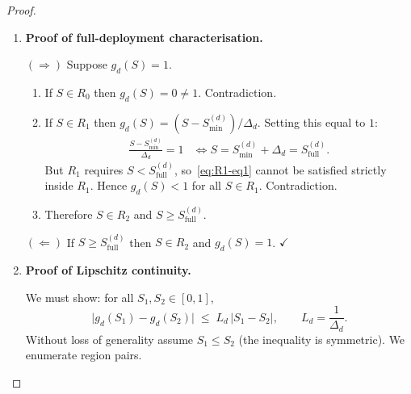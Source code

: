 \documentclass[12pt,openany]{book}
\numberwithin{equation}{chapter}
\theoremstyle{plain}
\theoremstyle{definition}
\theoremstyle{remark}
\def\mathcal#1{#1}%
\begin{document}
\begin{proof}
\begin{enumerate}
\item \textbf{Proof of full-deployment characterisation.}

\noindent$(\Rightarrow)$\quad
Suppose $g_d(\mathcal{S}) = 1$.
\begin{enumerate}
  \item If $\mathcal{S} \in R_0$ then $g_d(\mathcal{S}) = 0 \neq 1$.
        Contradiction.
  \item If $\mathcal{S} \in R_1$ then
        $g_d(\mathcal{S}) = (\mathcal{S}-\mathcal{S}_{\min}^{(d)})/\Delta_d$.
        Setting this equal to $1$:
        \begin{align}
          \frac{\mathcal{S} - \mathcal{S}_{\min}^{(d)}}{\Delta_d} = 1
          &\iff
          \mathcal{S} = \mathcal{S}_{\min}^{(d)} + \Delta_d
          = \mathcal{S}_{\mathrm{full}}^{(d)}.
          \label{eq:R1-eq1}
        \end{align}
        But $R_1$ requires
        $\mathcal{S} < \mathcal{S}_{\mathrm{full}}^{(d)}$,
        so~\eqref{eq:R1-eq1} cannot be satisfied strictly inside $R_1$.
        Hence $g_d(\mathcal{S}) < 1$ for all $\mathcal{S} \in R_1$.
        Contradiction.
  \item Therefore $\mathcal{S} \in R_2$ and
        $\mathcal{S} \geq \mathcal{S}_{\mathrm{full}}^{(d)}$.
\end{enumerate}

\noindent$(\Leftarrow)$\quad
If $\mathcal{S} \geq \mathcal{S}_{\mathrm{full}}^{(d)}$ then
$\mathcal{S} \in R_2$ and $g_d(\mathcal{S}) = 1$. \hfill$\checkmark$

\item \textbf{Proof of Lipschitz continuity.}

We must show: for all
$\mathcal{S}_1, \mathcal{S}_2 \in [0,1]$,
\begin{equation}
  \bigl|g_d(\mathcal{S}_1) - g_d(\mathcal{S}_2)\bigr|
  \;\leq\;
  L_d \,\bigl|\mathcal{S}_1 - \mathcal{S}_2\bigr|,
  \qquad
  L_d = \frac{1}{\Delta_d}.
  \label{eq:lipschitz-goal}
\end{equation}
Without loss of generality assume $\mathcal{S}_1 \leq \mathcal{S}_2$
(the inequality is symmetric). We enumerate region pairs.


\end{enumerate}
\end{proof}
\end{document}
